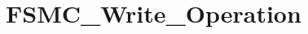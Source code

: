 \hypertarget{group___f_s_m_c___write___operation}{\section{F\-S\-M\-C\-\_\-\-Write\-\_\-\-Operation}
\label{group___f_s_m_c___write___operation}
}
